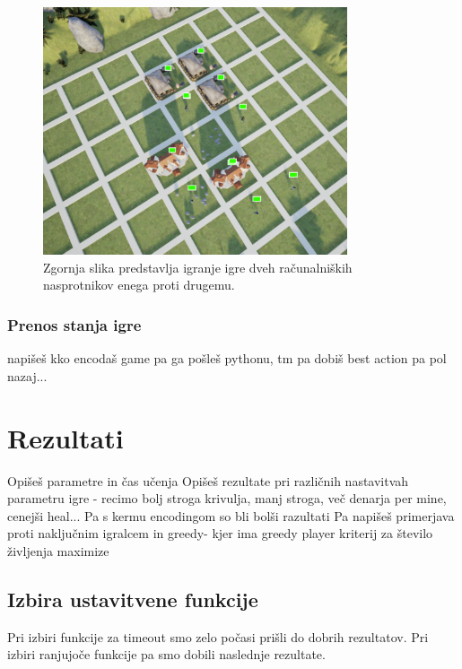 \documentclass[a4paper, 12pt]{book}
\begin{document}
\begin{figure}[h]
	\begin{center}
		\includegraphics[width=0.8\textwidth]{visualization_ue4.pdf}
	\end{center}
	\caption{Zgornja slika predstavlja igranje igre dveh računalniških nasprotnikov enega proti drugemu.}
	\label{visualization_ue4}
\end{figure}

\subsection{Prenos stanja igre}
napišeš kko encodaš game pa ga pošleš pythonu, tm pa dobiš best action pa pol nazaj...


\chapter{Rezultati}
\label{chrezultati}
Opišeš parametre in čas učenja
Opišeš rezultate pri različnih nastavitvah parametru igre - recimo bolj stroga krivulja, manj stroga, več denarja per mine, cenejši heal...
Pa s kermu encodingom so bli bolši razultati
Pa napišeš primerjava proti naključnim igralcem in greedy- kjer ima greedy player kriterij za število življenja maximize
\section{Izbira ustavitvene funkcije}
Pri izbiri funkcije za timeout smo zelo počasi prišli do dobrih rezultatov.
Pri izbiri ranjujoče funkcije pa smo dobili naslednje rezultate.
\end{document}
